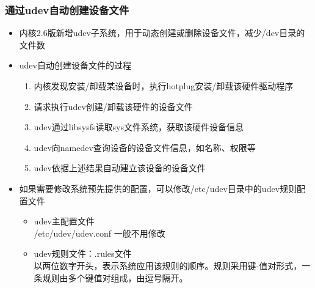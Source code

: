\documentclass[xcolor=svgnames,presentation]{beamer}
\begin{document}
\begin{frame}
\frametitle{通过udev自动创建设备文件}
\label{sec-4-3}
\begin{itemize}

\item 内核2.6版新增udev子系统，用于动态创建或删除设备文件，减少/dev目录的文件数
\label{sec-4-3-1}%

\item udev自动创建设备文件的过程
\label{sec-4-3-2}%
\begin{enumerate}
\item 内核发现安装/卸载某设备时，执行hotplug安装/卸载该硬件驱动程序
\item 请求执行udev创建/卸载该硬件的设备文件
\item udev通过libsysfs读取sys文件系统，获取该硬件设备信息
\item udev向namedev查询设备的设备文件信息，如名称、权限等
\item udev依据上述结果自动建立该设备的设备文件
\end{enumerate}

\item 如果需要修改系统预先提供的配置，可以修改/etc/udev目录中的udev规则配置文件
\label{sec-4-3-3}%
\begin{itemize}

\item udev主配置文件\\
\label{sec-4-3-3-1}%
/etc/udev/udev.conf 一般不用修改

\item udev规则文件：.rules文件\\
\label{sec-4-3-3-2}%
以两位数字开头，表示系统应用该规则的顺序。规则采用键-值对形式，一条规则由多个键值对组成，由逗号隔开。
\end{itemize} %
\end{itemize} %
\end{frame}
\end{document}
